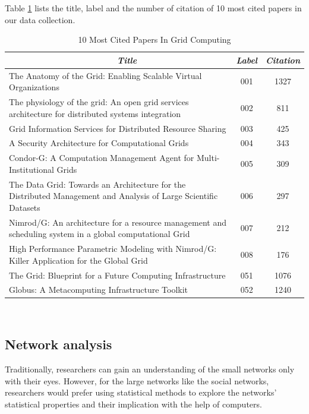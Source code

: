 Table \ref{T:name} lists the title, label and the number of citation of 10 most cited papers in our data collection.
\begin{table}[htb]
\begin{center}
\begin{small}
\begin {tabular} {|p{5.5cm}|c|c|}
\hline 
{\em \bf ~~~~~~~~~~~~~~~~~~~~~~Title} & {\em \bf Label} &{\em \bf Citation}\\
\hline
\hline
The Anatomy of the Grid: Enabling Scalable Virtual Organizations & 001&1327 \\
\hline
The physiology of the grid: An open grid services architecture for distributed systems integration & 002&811 \\
\hline
Grid Information Services for Distributed Resource Sharing  & 003&425 \\
\hline
A Security Architecture for Computational Grids  & 004&343 \\
\hline
Condor-G: A Computation Management Agent for Multi-Institutional Grids & 005&309 \\
\hline
The Data Grid: Towards an Architecture for the Distributed Management and Analysis of Large 
Scientific Datasets & 006&297 \\
\hline
Nimrod/G: An architecture for a resource management and scheduling system in a global computational Grid & 007&212 \\
\hline
High Performance Parametric Modeling with Nimrod/G: Killer Application for the Global Grid & 008&176 \\
\hline
The Grid: Blueprint for a Future Computing Infrastructure & 051&1076 \\
\hline
Globus: A Metacomputing Infrastructure Toolkit& 052&1240 \\
\hline
\end {tabular}

\end{small}
\caption{ 10 Most Cited Papers In Grid Computing}
\label {T:name}
\end{center}
\end {table}
~\\
\subsection{Network analysis}
Traditionally, researchers can gain an understanding of the small networks only with their eyes. However, for the large networks like the social networks, researchers would prefer using statistical methods to explore the networks' statistical properties and their implication with the help of computers.

